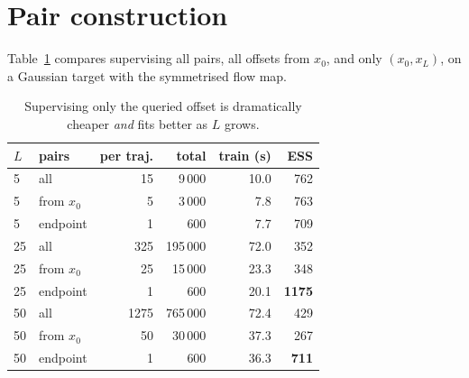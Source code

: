 \documentclass[mlabstract,onecolumn]{jmlr}
\begin{document}
\section{Pair construction}
\label{app:pairs}

Table~\ref{tab:pairs} compares supervising all pairs, all offsets from $x_0$, and
only $(x_0, x_L)$, on a Gaussian target with the symmetrised flow map.

\begin{table}[h]
\centering
\caption{Supervising only the queried offset is dramatically cheaper \emph{and}
fits better as $L$ grows.}
\label{tab:pairs}
\begin{tabular}{llrrrr}
\toprule
$L$ & pairs & per traj. & total & train (s) & ESS \\
\midrule
5  & all        & 15   & 9\,000   & 10.0 & 762 \\
5  & from $x_0$ & 5    & 3\,000   & 7.8  & 763 \\
5  & endpoint   & 1    & 600      & 7.7  & 709 \\
\midrule
25 & all        & 325  & 195\,000 & 72.0 & 352 \\
25 & from $x_0$ & 25   & 15\,000  & 23.3 & 348 \\
25 & endpoint   & 1    & 600      & 20.1 & \textbf{1175} \\
\midrule
50 & all        & 1275 & 765\,000 & 72.4 & 429 \\
50 & from $x_0$ & 50   & 30\,000  & 37.3 & 267 \\
50 & endpoint   & 1    & 600      & 36.3 & \textbf{711} \\
\bottomrule
\end{tabular}
\end{table}


\end{document}
